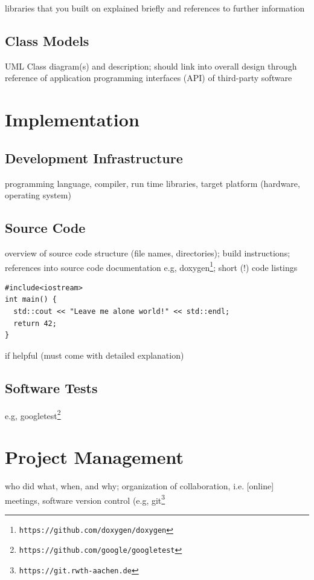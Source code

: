 \documentclass{book}
\begin{document}
libraries that you built on explained briefly and references to further information

\section{Class Models}

UML Class diagram(s) and description; should link into overall design through
reference of application programming interfaces (API) of third-party software

\chapter{Implementation} \label{ch:implementation}

\section{Development Infrastructure}

programming language, compiler, run time libraries, target platform
(hardware, operating system)

\section{Source Code}

overview of source code structure (file names, directories); build instructions; references into source code documentation e.g, doxygen\footnote{\tt https://github.com/doxygen/doxygen}; short (!) code listings
\begin{lstlisting}
#include<iostream>
int main() {
  std::cout << "Leave me alone world!" << std::endl;
  return 42;
}
\end{lstlisting}
if helpful (must come with detailed explanation)

\section{Software Tests}

e.g, googletest\footnote{\tt https://github.com/google/googletest}

\chapter{Project Management} \label{ch:projectmanagement}

who did what, when, and why; organization of collaboration, i.e. [online] meetings, software version control (e.g, git\footnote{\tt https://git.rwth-aachen.de}
\end{document}
